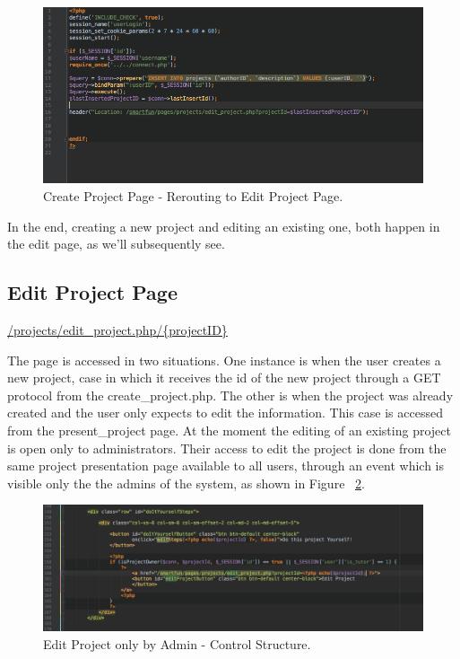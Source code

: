 \begin{figure}
\includegraphics[width=1\linewidth]{images/CreateProjectPage.png}
\caption{Create Project Page - Rerouting to Edit Project Page.}
\label{fig:create_project}
\end{figure}


In the end, creating a new project and editing an existing one, both happen in the edit page, as we'll subsequently see.

\subsection{Edit Project Page}
\url{/projects/edit\_project.php/{projectID}}

The page is accessed in two situations. One instance is when the user creates a new project, case in which it receives the id of the new project through a GET protocol from the create\_project.php.
The other is when the project was already created and the user only expects to edit the information. This case is accessed from the present\_project page. At the moment the editing of an existing project is open only to administrators. Their access to edit the project is done from the same project presentation page available to all users, through an event which is visible only the the admins of the system, as shown in Figure ~\ref{fig:edit_project}.\\

\begin{figure}
\includegraphics[width=1\linewidth]{images/edit.png}
\caption{Edit Project only by Admin - Control Structure.}
\label{fig:edit_project}
\end{figure}	

